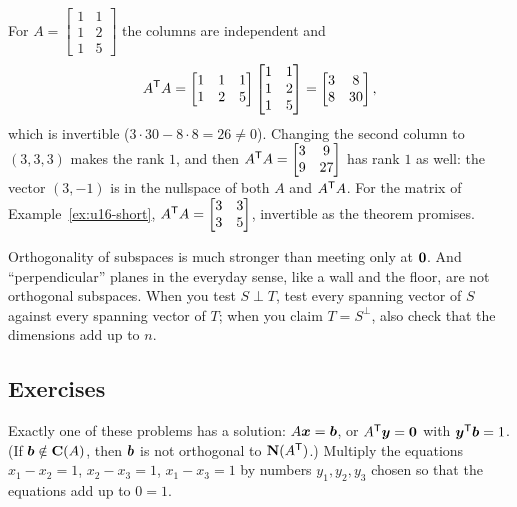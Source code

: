 \begin{example}\label{ex:u16-ata}
For $A=\begin{bmatrix}1&1\\1&2\\1&5\end{bmatrix}$ the columns are independent and
\[
  A^{\mathsf{T}} A=\begin{bmatrix}1&1&1\\1&2&5\end{bmatrix}\begin{bmatrix}1&1\\1&2\\1&5\end{bmatrix}
  =\begin{bmatrix}3&8\\8&30\end{bmatrix},
\]
which is invertible ($3\cdot 30-8\cdot 8=26\neq 0$). Changing the second column to $(3,3,3)$
makes the rank $1$, and then $A^{\mathsf{T}} A=\begin{bmatrix}3&9\\9&27\end{bmatrix}$ has rank $1$ as
well: the vector $(3,-1)$ is in the nullspace of both $A$ and $A^{\mathsf{T}} A$. For the matrix of
Example~\ref{ex:u16-short}, $A^{\mathsf{T}} A=\begin{bmatrix}3&3\\3&5\end{bmatrix}$, invertible as the
theorem promises.
\end{example}

\begin{trap}
Orthogonality of subspaces is much stronger than meeting only at $\boldsymbol{0}$. And
``perpendicular'' planes in the everyday sense, like a wall and the floor, are not orthogonal
subspaces. When you test $S\perp T$, test every spanning vector of $S$ against every
spanning vector of $T$; when you claim $T=S^{\perp}$, also check that the dimensions add up
to $n$.
\end{trap}

\subsection{Exercises}

\begin{exercise}\label{ex:u16-fredholm}
Exactly one of these problems has a solution: $A\boldsymbol{x}=\boldsymbol{b}$, or $A^{\mathsf{T}}\boldsymbol{y}=\boldsymbol{0}$ with
$\boldsymbol{y}^{\mathsf{T}}\boldsymbol{b}=1$. (If $\boldsymbol{b}\notin\mathbf{C}(A)$, then $\boldsymbol{b}$ is not orthogonal to
$\mathbf{N}(A^{\mathsf{T}})$.) Multiply the equations $x_1-x_2=1$, $x_2-x_3=1$, $x_1-x_3=1$ by numbers
$y_1,y_2,y_3$ chosen so that the equations add up to $0=1$.
\end{exercise}

